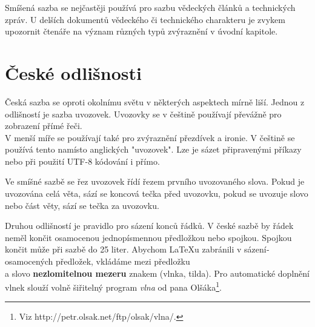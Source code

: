 \documentclass[a4paper, 11pt, twocolumn]{article}
\begin{document}
Smíšená sazba se nejčastěji používá pro sazbu vědeckých článků a technických zpráv.
 U delší­ch dokumentů vědeckého či technického charakteru je zvykem upozornit čtenáře na význam různých typů zvýraznění­ v úvodní­ kapitole.

\section{České odlišnosti}

Česká sazba se oproti okolní­mu světu v některých aspektech mí­rně liší­. Jednou z odlišností 
je saz\-ba uvozovek. Uvozovky se v češtině použí­vají­ převážně pro zobrazení­ pří­mé řeči. \\V menší­ 
míře se použí­vají­ také pro zvýraznění­ přezdí­vek a ironie. V češtině se použí­vá tento 
 namí­sto anglických "uvozovek". Lze je sázet připravenými příkazy
 nebo při použití UTF-8 kódování i přímo.

Ve smíšné sazbě se řez uvozovek ří­dí­ řezem první­ho uvozovaného slova. Pokud je uvozována 
celá věta, sází­ se koncová tečka před uvozovku, pokud se uvozuje slovo nebo část věty, sází­ se tečka za uvozovku.

Druhou odlišností je pravidlo pro sázení­ konců řádků. V české sazbě by řádek neměl končit 
osa\-mo\-ce\-nou jednopí­smennou předložkou nebo spojkou. Spojkou  končit může při sazbě do 
25 liter. Abychom \LaTeX u zabránili v sázení­ osamocených předložek, vkládáme mezi předložku
\\a slovo \textbf{nezlomitelnou mezeru} znakem \texttildelow (vlnka, tilda). Pro automatické doplnění 
vlnek slouží­ volně šiřitelný program \emph{vlna} od pana Olšáka\footnote{Viz http://petr.olsak.net/ftp/olsak/vlna/.
}.
\end{document}
